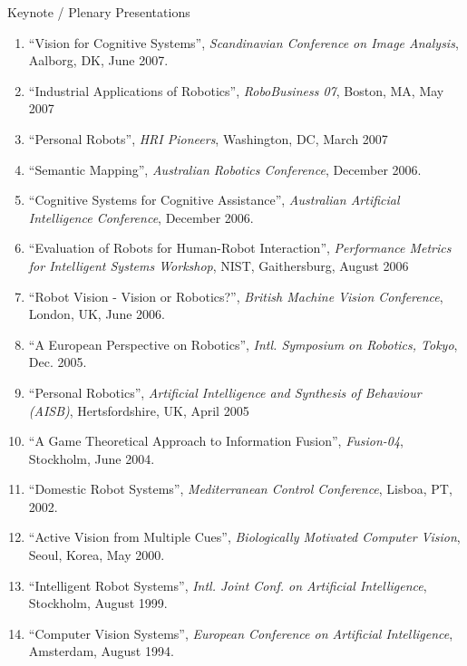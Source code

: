 \documentclass{article}
\begin{document}
\begin{cv}
\begin{cvlist}{Keynote / Plenary Presentations}
\begin{enumerate}
{    International Conference on Advanced Robotics}, Jeju Island,
    Korea, August 2007.
  \item ``Vision for Cognitive Systems'', {\em Scandinavian Conference
    on Image Analysis}, Aalborg, DK, June 2007.
  \item ``Industrial Applications of Robotics'', {\em RoboBusiness
    07}, Boston, MA, May 2007
  \item ``Personal Robots'', {\em HRI Pioneers}, Washington, DC, March
    2007
  \item ``Semantic Mapping'', {\em Australian Robotics Conference},
    December 2006.
  \item ``Cognitive Systems for Cognitive Assistance'', {\em
    Australian Artificial Intelligence Conference}, December 2006.
  \item ``Evaluation of Robots for Human-Robot Interaction'', {\em
    Performance Metrics for Intelligent Systems Workshop}, NIST,
    Gaithersburg, August 2006
  \item ``Robot Vision - Vision or Robotics?'', {\em British Machine
    Vision Conference}, London, UK, June 2006.
  \item ``A European Perspective on Robotics'', {\em Intl. Symposium
    on Robotics, Tokyo}, Dec. 2005.
  \item ``Personal Robotics'', {\em Artificial Intelligence and
    Synthesis of Behaviour (AISB)}, Hertsfordshire, UK, April 2005
  \item ``A Game Theoretical Approach to Information Fusion'', {\em
    Fusion-04}, Stockholm, June 2004.
  \item ``Domestic Robot Systems'', {\em Mediterranean Control
    Conference}, Lisboa, PT, 2002.
  \item ``Active Vision from Multiple Cues'', {\em Biologically
    Motivated Computer Vision}, Seoul, Korea, May 2000.
  \item ``Intelligent Robot Systems'', {\em Intl. Joint Conf. on
    Artificial Intelligence}, Stockholm, August 1999.
  \item ``Computer Vision Systems'', {\em European Conference on
    Artificial Intelligence}, Amsterdam, August 1994.
  \end{enumerate}
\end{cvlist}


\end{cv}
\end{document}
